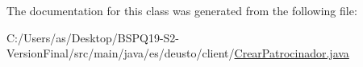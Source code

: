 The documentation for this class was generated from the following file\+:\begin{DoxyCompactItemize}
\item 
C\+:/\+Users/as/\+Desktop/\+B\+S\+P\+Q19-\/\+S2-\/\+Version\+Final/src/main/java/es/deusto/client/\mbox{\hyperlink{_crear_patrocinador_8java}{Crear\+Patrocinador.\+java}}\end{DoxyCompactItemize}
